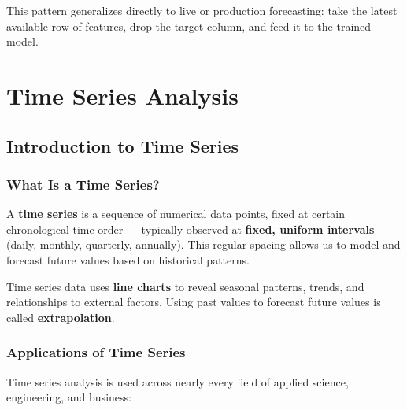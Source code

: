 \documentclass[12pt,openany]{book}
\begin{document}
This pattern generalizes directly to live or production forecasting: take the latest available row of features, drop the target column, and feed it to the trained model.

\section{Time Series Analysis}


\subsection{Introduction to Time Series}

\subsubsection{What Is a Time Series?}

A \textbf{time series} is a sequence of numerical data points, fixed at certain chronological time order --- typically observed at \textbf{fixed, uniform intervals} (daily, monthly, quarterly, annually). This regular spacing allows us to model and forecast future values based on historical patterns.

Time series data uses \textbf{line charts} to reveal seasonal patterns, trends, and relationships to external factors. Using past values to forecast future values is called \textbf{extrapolation}.

\subsubsection{Applications of Time Series}

Time series analysis is used across nearly every field of applied science, engineering, and business:
\end{document}
